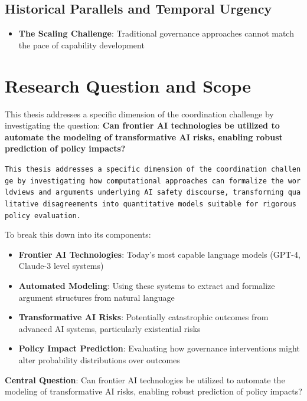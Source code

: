 \documentclass[
  11pt,
  letterpaper,
]{book}
\providecommand{\tightlist}{%
  \setlength{\itemsep}{0pt}\setlength{\parskip}{0pt}}
\begin{document}
\subsection{Historical Parallels and Temporal
Urgency}\label{sec-historical-parallels}

\begin{itemize}
\tightlist
\item
  \textbf{The Scaling Challenge}: Traditional governance approaches
  cannot match the pace of capability development
\end{itemize}

\section{Research Question and Scope}\label{sec-research-question}

This thesis addresses a specific dimension of the coordination challenge
by investigating the question: \textbf{Can frontier AI technologies be
utilized to automate the modeling of transformative AI risks, enabling
robust prediction of policy impacts?}

\texttt{This\ thesis\ addresses\ a\ specific\ dimension\ of\ the\ coordination\ challenge\ by\ investigating\ how\ computational\ approaches\ can\ formalize\ the\ worldviews\ and\ arguments\ underlying\ AI\ safety\ discourse,\ transforming\ qualitative\ disagreements\ into\ quantitative\ models\ suitable\ for\ rigorous\ policy\ evaluation.}

To break this down into its components:

\begin{itemize}
\tightlist
\item
  \textbf{Frontier AI Technologies}: Today's most capable language
  models (GPT-4, Claude-3 level systems)
\item
  \textbf{Automated Modeling}: Using these systems to extract and
  formalize argument structures from natural language
\item
  \textbf{Transformative AI Risks}: Potentially catastrophic outcomes
  from advanced AI systems, particularly existential risks
\item
  \textbf{Policy Impact Prediction}: Evaluating how governance
  interventions might alter probability distributions over outcomes
\end{itemize}

\textbf{Central Question}: Can frontier AI technologies be utilized to
automate the modeling of transformative AI risks, enabling robust
prediction of policy impacts?
\end{document}
